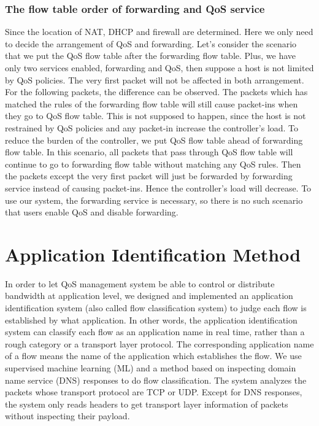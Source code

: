 \documentclass[journal]{IEEEtran}
\begin{document}
\subsubsection{The flow table order of forwarding and QoS service}
Since the location of NAT, DHCP and firewall are determined. Here we only need to decide the arrangement of QoS and forwarding.
Let's consider the scenario that we put the QoS flow table after the forwarding flow table. Plus, we have only two services enabled, forwarding and QoS, then suppose a host is not limited by QoS policies. The very first packet will not be affected in both arrangement. For the following packets, the difference can be observed. The packets which has matched the rules of the forwarding flow table will still cause packet-ins when they go to QoS flow table. This is not supposed to happen, since the host is not restrained by QoS policies and any packet-in increase the controller's load.
To reduce the burden of the controller, we put QoS flow table ahead of forwarding flow table. In this scenario, all packets that pass through QoS flow table will continue to go to forwarding flow table without matching any QoS rules. Then the packets except the very first packet will just be forwarded by forwarding service instead of causing packet-ins. Hence the controller's load will decrease. To use our system, the forwarding service is necessary, so there is no such scenario that users enable QoS and disable forwarding.






\section{Application Identification Method}\label{sec:app_identification}
In order to let QoS management system be able to control or distribute bandwidth at application level, we designed and implemented an application identification system (also called flow classification system) to judge each flow is established by what application. In other words, the application identification system can classify each flow as an application name in real time, rather than a rough category or a transport layer protocol. The corresponding application name of a flow means the name of the application which establishes the flow. We use supervised machine learning (ML) and a method based on inspecting domain name service (DNS) responses to do flow classification. The system analyzes the packets whose transport protocol are TCP or UDP. Except for DNS responses, the system only reads headers to get transport layer information of packets without inspecting their payload.
\end{document}
